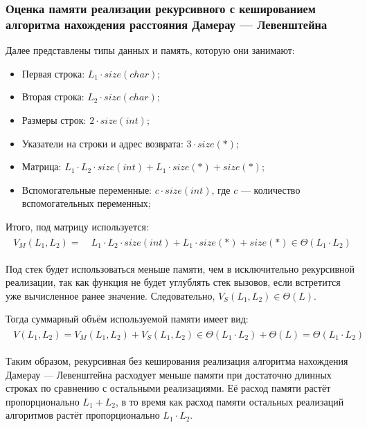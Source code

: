 \subsubsection{Оценка памяти реализации рекурсивного с кешированием алгоритма нахождения расстояния Дамерау --- Левенштейна}
Далее представлены типы данных и память, которую они занимают:
\begin{itemize}
    \item Первая строка: $L_1 \cdot size(char)$;
    \item Вторая строка: $L_2 \cdot size(char)$;
    \item Размеры строк: $2 \cdot size(int)$;
    \item Указатели на строки и адрес возврата: $3 \cdot size(*)$;
    \item Матрица: $L_1 \cdot L_2 \cdot size(int) + L_1 \cdot size(*) + size(*)$;
    \item Вспомогательные переменные: $c \cdot size(int)$, где $c$ --- количество вспомогательных переменных;
\end{itemize}

Итого, под матрицу используется:
\begin{multline}
\begin{aligned}
V_M(L_1,L_2) =\ &L_1 \cdot L_2 \cdot size(int) + L_1 \cdot size(*) + size(*) \in \Theta(L_1 \cdot L_2)
\end{aligned}
\end{multline}

Под стек будет использоваться меньше памяти, чем в исключительно рекурсивной реализации, так как функция не будет углублять стек вызовов, если встретится уже вычисленное ранее значение.
Следовательно, $V_S(L_1,L_2) \in \Theta(L)$.

Тогда суммарный объём используемой памяти имеет вид:
\begin{multline}
\begin{aligned}
V(L_1,L_2) = V_M(L_1,L_2) + V_S(L_1,L_2) \in \Theta(L_1 \cdot L_2) + \Theta(L) = \Theta(L_1 \cdot L_2)
\end{aligned}
\end{multline}

Таким образом, рекурсивная без кеширования реализация алгоритма нахождения Дамерау --- Левенштейна расходует меньше памяти при достаточно длинных строках по сравнению с остальными реализациями.
Её расход памяти растёт пропорционально $L_1 + L_2$, в то время как расход памяти остальных реализаций алгоритмов растёт пропорционально $L_1 \cdot L_2$.

